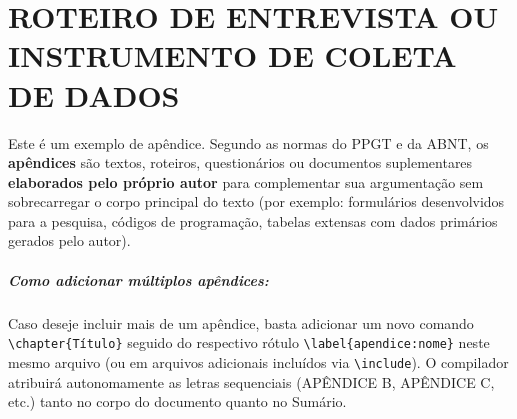 \appendix

%

\chapter{ROTEIRO DE ENTREVISTA OU INSTRUMENTO DE COLETA DE DADOS}
\label{apendice:instrumento_coleta}

Este é um exemplo de apêndice. Segundo as normas do PPGT e da ABNT, os \textbf{apêndices} são textos, roteiros, questionários ou documentos suplementares \textbf{elaborados pelo próprio autor} para complementar sua argumentação sem sobrecarregar o corpo principal do texto (por exemplo: formulários desenvolvidos para a pesquisa, códigos de programação, tabelas extensas com dados primários gerados pelo autor).

\paragraph*{Como adicionar múltiplos apêndices:} Caso deseje incluir mais de um apêndice, basta adicionar um novo comando \texttt{\textbackslash chapter\{Título\}} seguido do respectivo rótulo \texttt{\textbackslash label\{apendice:nome\}} neste mesmo arquivo (ou em arquivos adicionais incluídos via \texttt{\textbackslash include}). O compilador atribuirá autonomamente as letras sequenciais (APÊNDICE B, APÊNDICE C, etc.) tanto no corpo do documento quanto no Sumário.

%
